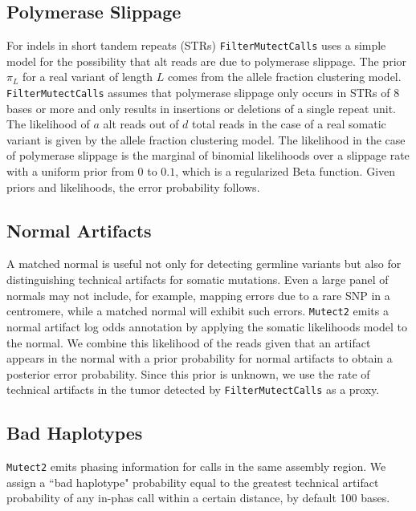 \documentclass[nofootinbib,amssymb,amsmath]{revtex4}
\newcommand{\code}[1]{\texttt{#1}}
\begin{document}
\subsection{Polymerase Slippage}\label{polymerase-slippage}
For indels in short tandem repeats (STRs) \code{FilterMutectCalls} uses a simple model for the possibility that alt reads are due to polymerase slippage.  The prior $\pi_L$ for a real variant of length $L$ comes from the allele fraction clustering model.  \code{FilterMutectCalls} assumes that polymerase slippage only occurs in STRs of 8 bases or more and only results in insertions or deletions of a single repeat unit.  The likelihood of $a$ alt reads out of $d$ total reads in the case of a real somatic variant is given by the allele fraction clustering model.  The likelihood in the case of polymerase slippage is the marginal of binomial likelihoods over a slippage rate with a uniform prior from 0 to $0.1$, which is a regularized Beta function.  Given priors and likelihoods, the error probability follows.

\subsection{Normal Artifacts}\label{normal-artifact}
A matched normal is useful not only for detecting germline variants but also for distinguishing technical artifacts for somatic mutations.  Even a large panel of normals may not include, for example, mapping errors due to a rare SNP in a centromere, while a matched normal will exhibit such errors.  \code{Mutect2} emits a normal artifact log odds annotation by applying the somatic likelihoods model to the normal.  We combine this likelihood of the reads given that an artifact appears in the normal with a prior probability for normal artifacts to obtain a posterior error probability.  Since this prior is unknown, we use the rate of technical artifacts in the tumor detected by \code{FilterMutectCalls} as a proxy.

\subsection{Bad Haplotypes}\label{bad-haplotype}
\code{Mutect2} emits phasing information for calls in the same assembly region.  We assign a ``bad haplotype" probability equal to the greatest technical artifact probability of any in-phas call within a certain distance, by default 100 bases.
\end{document}
